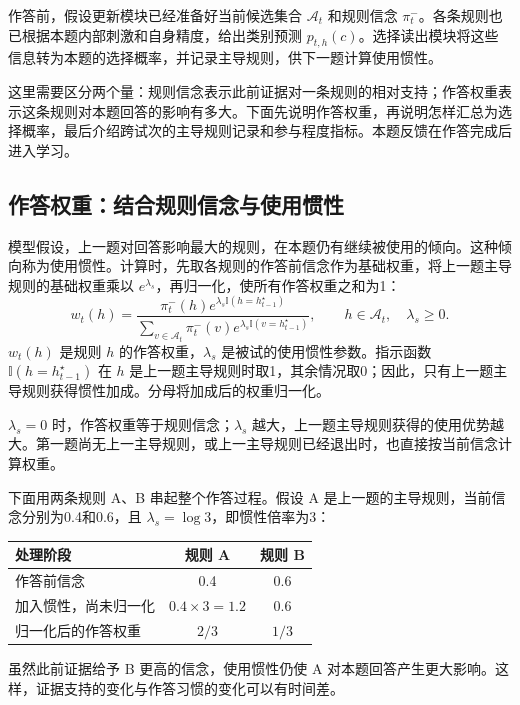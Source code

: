 \documentclass[12pt]{article}
\newcommand{\ind}{\mathbb I}
\begin{document}
作答前，假设更新模块已经准备好当前候选集合 $\mathcal A_t$ 和规则信念 $\pi_t^-$。各条规则也已根据本题内部刺激和自身精度，给出类别预测 $p_{t,h}(c)$。选择读出模块将这些信息转为本题的选择概率，并记录主导规则，供下一题计算使用惯性。

这里需要区分两个量：规则信念表示此前证据对一条规则的相对支持；作答权重表示这条规则对本题回答的影响有多大。下面先说明作答权重，再说明怎样汇总为选择概率，最后介绍跨试次的主导规则记录和参与程度指标。本题反馈在作答完成后进入学习。

\subsection{作答权重：结合规则信念与使用惯性}

模型假设，上一题对回答影响最大的规则，在本题仍有继续被使用的倾向。这种倾向称为使用惯性。计算时，先取各规则的作答前信念作为基础权重，将上一题主导规则的基础权重乘以 $e^{\lambda_s}$，再归一化，使所有作答权重之和为1：
\begin{equation}
w_t(h)=
\frac{\pi_t^-(h)e^{\lambda_s\ind(h=h_{t-1}^{\star})}}
{\sum_{v\in \mathcal A_t}\pi_t^-(v)e^{\lambda_s\ind(v=h_{t-1}^{\star})}},
\qquad h\in \mathcal A_t,\quad\lambda_s\geq0.
\label{eq:execution}
\end{equation}
$w_t(h)$ 是规则 $h$ 的作答权重，$\lambda_s$ 是被试的使用惯性参数。指示函数 $\ind(h=h_{t-1}^{\star})$ 在 $h$ 是上一题主导规则时取1，其余情况取0；因此，只有上一题主导规则获得惯性加成。分母将加成后的权重归一化。

$\lambda_s=0$ 时，作答权重等于规则信念；$\lambda_s$ 越大，上一题主导规则获得的使用优势越大。第一题尚无上一主导规则，或上一主导规则已经退出时，也直接按当前信念计算权重。

下面用两条规则 A、B 串起整个作答过程。假设 A 是上一题的主导规则，当前信念分别为0.4和0.6，且 $\lambda_s=\log3$，即惯性倍率为3：

\begin{center}
\begin{tabular}{lcc}
\toprule
处理阶段 & 规则 A & 规则 B\\
\midrule
作答前信念 & 0.4 & 0.6\\
加入惯性，尚未归一化 & $0.4\times3=1.2$ & 0.6\\
归一化后的作答权重 & $2/3$ & $1/3$\\
\bottomrule
\end{tabular}
\end{center}

虽然此前证据给予 B 更高的信念，使用惯性仍使 A 对本题回答产生更大影响。这样，证据支持的变化与作答习惯的变化可以有时间差。
\end{document}
